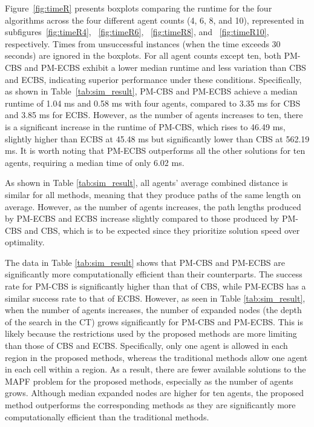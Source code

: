 \documentclass[letterpaper, 10 pt, conference]{ieeeconf}  %
\begin{document}
Figure~\ref{fig:timeR} presents boxplots comparing the runtime for the four algorithms across the four different agent counts (4, 6, 8, and 10), represented in subfigures~\ref{fig:timeR4}, ~\ref{fig:timeR6}, ~\ref{fig:timeR8}, and ~\ref{fig:timeR10}, respectively. Times from unsuccessful instances (when the time exceeds 30 seconds) are ignored in the boxplots. For all agent counts except ten, both PM-CBS and PM-ECBS exhibit a lower median runtime and less variation than CBS and ECBS, indicating superior performance under these conditions. Specifically, as shown in Table~\ref{tab:sim_result}, PM-CBS and PM-ECBS achieve a median runtime of 1.04 ms and 0.58 ms with four agents, compared to 3.35 ms for CBS and 3.85 ms for ECBS. 
However, as the number of agents increases to ten, there is a significant increase in the runtime of PM-CBS, which rises to 46.49 ms, slightly higher than ECBS at 45.48 ms but significantly lower than CBS at 562.19 ms. It is worth noting that PM-ECBS outperforms all the other solutions for ten agents, requiring a median time of only 6.02 ms.

As shown in Table \ref{tab:sim_result}, all agents' average combined distance is similar for all methods, meaning that they produce paths of the same length on average. However, as the number of agents increases, the path lengths produced by PM-ECBS and ECBS increase slightly compared to those produced by PM-CBS and CBS, which is to be expected since they prioritize solution speed over optimality.

The data in Table \ref{tab:sim_result} shows that PM-CBS and PM-ECBS are significantly more computationally efficient than their counterparts. The success rate for PM-CBS is significantly higher than that of CBS, while PM-ECBS has a similar success rate to that of ECBS. However, as seen in Table \ref{tab:sim_result}, when the number of agents increases, the number of expanded nodes (the depth of the search in the CT) grows significantly for PM-CBS and PM-ECBS. This is likely because the restrictions used by the proposed methods are more limiting than those of CBS and ECBS. Specifically, only one agent is allowed in each region in the proposed methods, whereas the traditional methods allow one agent in each cell within a region. As a result, there are fewer available solutions to the MAPF problem for the proposed methods, especially as the number of agents grows. Although median expanded nodes are higher for ten agents, the proposed method outperforms the corresponding methods as they are significantly more computationally efficient than the traditional methods.
\end{document}
